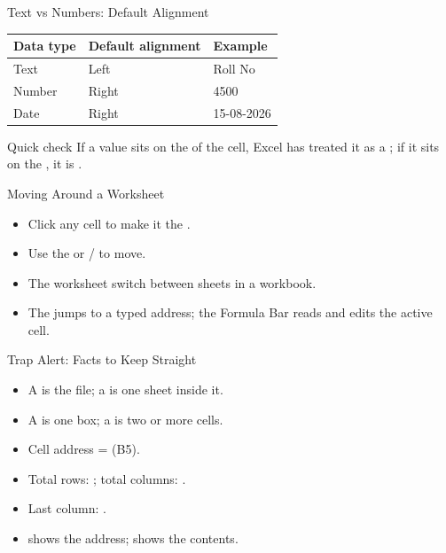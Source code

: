 \documentclass[aspectratio=169]{beamer}
\begin{document}
\begin{frame}{Text vs Numbers: Default Alignment}
  \begin{center}
    \begin{tabular}{lll}
      \toprule
      \textbf{Data type} & \textbf{Default alignment} & \textbf{Example} \\
      \midrule
      Text & Left & Roll No \\
      Number & Right & 4500 \\
      Date & Right & 15-08-2026 \\
      \bottomrule
    \end{tabular}
  \end{center}
  \vspace{0.3cm}
  \begin{block}{Quick check}
    If a value sits on the  of the cell, Excel has treated it as a
    ; if it sits on the , it is .
  \end{block}
\end{frame}

\begin{frame}{Moving Around a Worksheet}
  \begin{itemize}
    \item Click any cell to make it the .
    \item Use the  or  /  to move.
    \item The worksheet  switch between sheets in a workbook.
    \item The  jumps to a typed address; the Formula Bar reads
      and edits the active cell.
  \end{itemize}
\end{frame}

\begin{frame}{Trap Alert: Facts to Keep Straight}
  \begin{itemize}
    \item A  is the file; a  is one sheet inside
      it.
    \item A  is one box; a  is two or more cells.
    \item Cell address =  (B5).
    \item Total rows: ; total columns: .
    \item Last column: .
    \item {} shows the address;  shows the
      contents.
  \end{itemize}
\end{frame}
\end{document}
